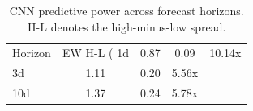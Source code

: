 \begin{table}[ht]
\centering
\caption{CNN predictive power across forecast horizons. H-L denotes the high-minus-low spread.}
\label{tab:horizon_eval}
\begin{tabular}{lccc}
\toprule
Horizon & EW H-L (%
\midrule
1d & 0.87 & 0.09 & 10.14x \\
3d & 1.11 & 0.20 & 5.56x \\
10d & 1.37 & 0.24 & 5.78x \\
\bottomrule
\end{tabular}
\end{table}
